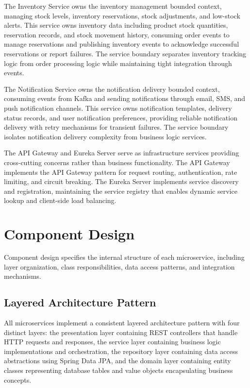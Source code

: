 The Inventory Service owns the inventory management bounded context, managing stock levels, inventory reservations, stock adjustments, and low-stock alerts. This service owns inventory data including product stock quantities, reservation records, and stock movement history, consuming order events to manage reservations and publishing inventory events to acknowledge successful reservations or report failures. The service boundary separates inventory tracking logic from order processing logic while maintaining tight integration through events.

The Notification Service owns the notification delivery bounded context, consuming events from Kafka and sending notifications through email, SMS, and push notification channels. This service owns notification templates, delivery status records, and user notification preferences, providing reliable notification delivery with retry mechanisms for transient failures. The service boundary isolates notification delivery complexity from business logic services.

The API Gateway and Eureka Server serve as infrastructure services providing cross-cutting concerns rather than business functionality. The API Gateway implements the API Gateway pattern for request routing, authentication, rate limiting, and circuit breaking. The Eureka Server implements service discovery and registration, maintaining the service registry that enables dynamic service lookup and client-side load balancing.

\section{Component Design}

Component design specifies the internal structure of each microservice, including layer organization, class responsibilities, data access patterns, and integration mechanisms.

\subsection{Layered Architecture Pattern}

All microservices implement a consistent layered architecture pattern with four distinct layers: the presentation layer containing REST controllers that handle HTTP requests and responses, the service layer containing business logic implementations and orchestration, the repository layer containing data access abstractions using Spring Data JPA, and the domain layer containing entity classes representing database tables and value objects encapsulating business concepts.

